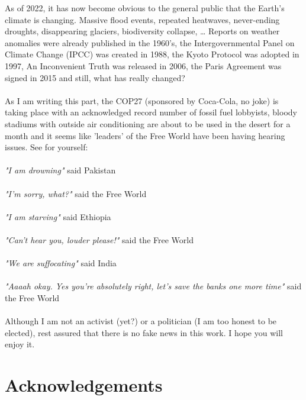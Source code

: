 \documentclass[a4paper]{report}
\begin{document}
As of 2022, it has now become obvious to the general public that the Earth's climate is changing. Massive flood events, repeated heatwaves, never-ending droughts, disappearing glaciers, biodiversity collapse, … Reports on weather anomalies were already published in the 1960's, the Intergovernmental Panel on Climate Change (IPCC) was created in 1988, the Kyoto Protocol was adopted in 1997, An Inconvenient Truth was released in 2006, the Paris Agreement was signed in 2015 and still, what has really changed?\\
\\
As I am writing this part, the COP27 (sponsored by Coca-Cola, no joke) is taking place with an acknowledged record number of fossil fuel lobbyists, bloody stadiums with outside air conditioning are about to be used in the desert for a month and it seems like 'leaders' of the Free World have been having hearing issues. See for yourself:\\
\\
\textit{"I am drowning"} said Pakistan\\
\\
\textit{"I'm sorry, what?"} said the Free World\\
\\
\textit{"I am starving"} said Ethiopia\\
\\
\textit{"Can't hear you, louder please!"} said the Free World\\
\\
\textit{"We are suffocating"} said India\\
\\
\textit{"Aaaah okay. Yes you're absolutely right, let's save the banks one more time"} said the Free World\\
\\
Although I am not an activist (yet?) or a politician (I am too honest to be elected), rest assured that there is no fake news in this work. I hope you will enjoy it.

\newpage
\thispagestyle{empty}
\null

\newpage
\thispagestyle{empty}
\null

\section*{Acknowledgements}
\end{document}
